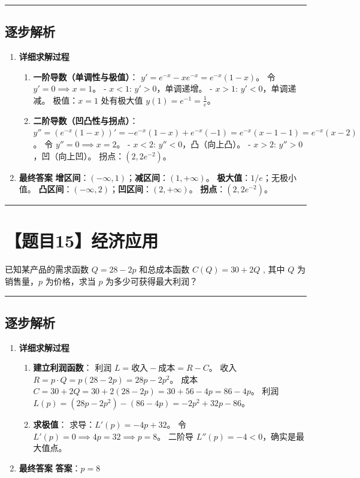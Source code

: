 \documentclass[UTF8]{ctexart}
\newenvironment{redenv}{\color{red}}{}
\newenvironment{detailedanalysis}{%
    \color{red}
    \begin{enumerate}[label=\textbf{第\arabic*步：}, leftmargin=*, align=left, itemsep=1.5ex]
}{%
    \end{enumerate}
}
\newcommand{\problemrule}{\noindent\rule{\textwidth}{1.5pt}\vspace{-0.8em}}
\newcommand{\analysisrule}{\noindent\rule{\textwidth}{0.8pt}\vspace{-0.8em}}
\begin{document}
\begin{redenv}
\analysisrule
\subsection*{逐步解析}

\begin{detailedanalysis}
\item \textbf{详细求解过程}
\begin{enumerate}[label=(\arabic*)]
\item \textbf{一阶导数（单调性与极值）}：
$y' = e^{-x} - xe^{-x} = e^{-x}(1-x)$。
令 $y'=0 \implies x=1$。
- $x < 1$: $y' > 0$，单调递增。
- $x > 1$: $y' < 0$，单调递减。
极值：$x=1$ 处有极大值 $y(1) = e^{-1} = \frac{1}{e}$。
\item \textbf{二阶导数（凹凸性与拐点）}：
$y'' = (e^{-x}(1-x))' = -e^{-x}(1-x) + e^{-x}(-1) = e^{-x}(x-1-1) = e^{-x}(x-2)$。
令 $y''=0 \implies x=2$。
- $x < 2$: $y'' < 0$，凸（向上凸）。
- $x > 2$: $y'' > 0$，凹（向上凹）。
拐点：$(2, 2e^{-2})$。
\end{enumerate}

\item \textbf{最终答案}
\textbf{增区间}：$(-\infty, 1)$；\textbf{减区间}：$(1, +\infty)$。
\textbf{极大值}：$1/e$；无极小值。
\textbf{凸区间}：$(-\infty, 2)$；\textbf{凹区间}：$(2, +\infty)$。
\textbf{拐点}：$(2, 2e^{-2})$。
\end{detailedanalysis}
\end{redenv}

\problemrule
\section*{【题目15】经济应用}
已知某产品的需求函数 $ Q = 28 - 2p $ 和总成本函数 $ C(Q) = 30 + 2Q $ , 其中 $Q$ 为销售量，$p$ 为价格，求当 $p$ 为多少可获得最大利润？

\begin{redenv}
\analysisrule
\subsection*{逐步解析}

\begin{detailedanalysis}
\item \textbf{详细求解过程}
\begin{enumerate}[label=(\arabic*)]
\item \textbf{建立利润函数}：
利润 $L = \text{收入} - \text{成本} = R - C$。
收入 $R = p \cdot Q = p(28 - 2p) = 28p - 2p^2$。
成本 $C = 30 + 2Q = 30 + 2(28 - 2p) = 30 + 56 - 4p = 86 - 4p$。
利润 $L(p) = (28p - 2p^2) - (86 - 4p) = -2p^2 + 32p - 86$。
\item \textbf{求极值}：
求导：$L'(p) = -4p + 32$。
令 $L'(p) = 0 \implies 4p = 32 \implies p = 8$。
二阶导 $L''(p) = -4 < 0$，确实是最大值点。
\end{enumerate}

\item \textbf{最终答案}
\textbf{答案}：$ p=8 $
\end{detailedanalysis}
\end{redenv}
\end{document}
